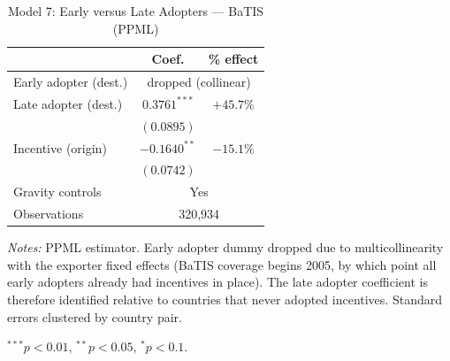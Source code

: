 \begin{table}[htbp]
\centering
\caption{Model 7: Early versus Late Adopters --- BaTIS (PPML)}
\label{tab:batis_model7}
\small
\begin{tabular}{l cc}
\toprule
 & Coef. & \% effect \\
\midrule
Early adopter (dest.) & \multicolumn{2}{c}{dropped (collinear)} \\[4pt]
Late adopter (dest.) & $0.3761^{***}$ & $+45.7\%$ \\
 & $(0.0895)$ & \\[4pt]
Incentive (origin) & $-0.1640^{**}$ & $-15.1\%$ \\
 & $(0.0742)$ & \\[4pt]
\midrule
Gravity controls & \multicolumn{2}{c}{Yes} \\
Observations & \multicolumn{2}{c}{320,934} \\
\bottomrule
\end{tabular}
\par\vspace{4pt}\noindent\begin{minipage}{\textwidth}
\footnotesize
\par \textit{Notes:} PPML estimator. Early adopter dummy dropped due to multicollinearity with the exporter fixed effects (BaTIS coverage begins 2005, by which point all early adopters already had incentives in place). The late adopter coefficient is therefore identified relative to countries that never adopted incentives. Standard errors clustered by country pair.
\par $^{***}p<0.01$, $^{**}p<0.05$, $^{*}p<0.1$.
\end{minipage}
\end{table}

\clearpage



